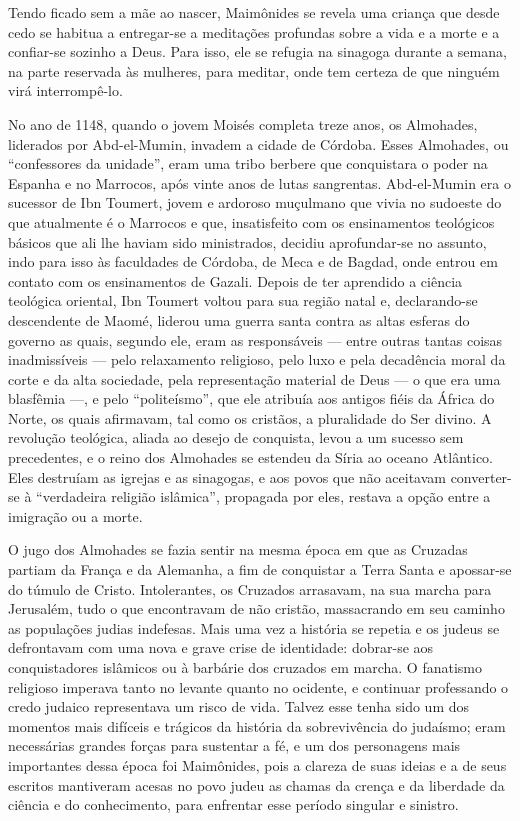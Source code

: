 Tendo ficado sem a mãe ao nascer, Maimônides se revela uma criança que
desde cedo se habitua a entregar-se a meditações profundas sobre a vida
e a morte e a confiar-se sozinho a Deus. Para isso, ele se refugia na
sinagoga durante a semana, na parte reservada às mulheres, para meditar,
onde tem certeza de que ninguém virá interrompê-lo.

No ano de 1148, quando o jovem Moisés completa treze anos, os Almohades,
liderados por Abd-el-Mumin, invadem a cidade de Córdoba. Esses
Almohades, ou ``confessores da unidade'', eram uma tribo berbere que
conquistara o poder na Espanha e no Marrocos, após vinte anos de lutas
sangrentas. Abd-el-Mumin era o sucessor de Ibn Toumert, jovem e ardoroso
muçulmano que vivia no sudoeste do que atualmente é o Marrocos e que,
insatisfeito com os ensinamentos teológicos básicos que ali lhe haviam
sido ministrados, decidiu aprofundar-se no assunto, indo para isso às
faculdades de Córdoba, de Meca e de Bagdad, onde entrou em contato com
os ensinamentos de Gazali. Depois de ter aprendido a ciência teológica
oriental, Ibn Toumert voltou para sua região natal e, declarando-se
descendente de Maomé, liderou uma guerra santa contra as altas esferas
do governo as quais, segundo ele, eram as responsáveis --- entre outras
tantas coisas inadmissíveis --- pelo relaxamento religioso, pelo luxo e
pela decadência moral da corte e da alta sociedade, pela representação
material de Deus --- o que era uma blasfêmia ---, e pelo ``politeísmo'',
que ele atribuía aos antigos fiéis da África do Norte, os quais
afirmavam, tal como os cristãos, a pluralidade do Ser divino. A
revolução teológica, aliada ao desejo de conquista, levou a um sucesso
sem precedentes, e o reino dos Almohades se estendeu da Síria ao oceano
Atlântico. Eles destruíam as igrejas e as sinagogas, e aos povos que
não aceitavam converter-se à ``verdadeira religião islâmica'',
propagada por eles, restava a opção entre a imigração ou a morte.

O jugo dos Almohades se fazia sentir na mesma época em que as Cruzadas
partiam da França e da Alemanha, a fim de conquistar a Terra Santa e
apossar-se do túmulo de Cristo. Intolerantes, os Cruzados arrasavam, na
sua marcha para Jerusalém, tudo o que encontravam de não cristão,
massacrando em seu caminho as populações judias indefesas. Mais uma vez
a história se repetia e os judeus se defrontavam com uma nova e grave
crise de identidade: dobrar-se aos conquistadores islâmicos ou à
barbárie dos cruzados em marcha. O fanatismo religioso imperava tanto
no levante quanto no ocidente, e continuar professando o credo judaico
representava um risco de vida. Talvez esse tenha sido um dos momentos
mais difíceis e trágicos da história da sobrevivência do judaísmo; eram
necessárias grandes forças para sustentar a fé, e um dos personagens
mais importantes dessa época foi Maimônides, pois a clareza de suas
ideias e a de seus escritos mantiveram acesas no povo judeu as chamas da
crença e da liberdade da ciência e do conhecimento, para enfrentar esse
período singular e sinistro.

